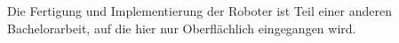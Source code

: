 Die Fertigung und Implementierung der Roboter ist Teil einer anderen Bachelorarbeit, auf die hier nur Oberflächlich eingegangen wird.                                                                                                                                                                                                                                                                                                                                                                                                                                                                                                                                                                                                                                                                                                                                                                                                                                                                                                                                                                                                                                                                                                                                                                                                                                                                                                                                                                                                                                                                                                                                                                                                                                                                                                                                                                                                                                                                                                                                                                                                                                                                                                                                                                                                                                                                                                                                                                                                                                                                                                                                                                                                                                                                                                                                                                                                                                                                                                                                                                                                                                                                                                                                                                                                                                                                                                                                   